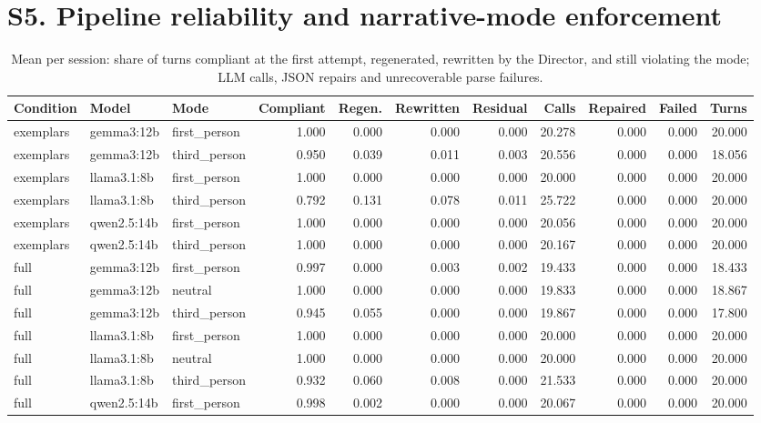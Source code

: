 \documentclass[10pt]{article}
\begin{document}
\section*{S5. Pipeline reliability and narrative-mode enforcement}

{\scriptsize
\begin{longtable}{lllrrrrrrrr}
\caption{Mean per session: share of turns compliant at the first attempt, regenerated, rewritten by the Director, and still violating the mode; LLM calls, JSON repairs and unrecoverable parse failures.}\\
\toprule
Condition & Model & Mode & Compliant & Regen. & Rewritten & Residual & Calls & Repaired & Failed & Turns \\
\midrule
\endhead
exemplars & gemma3:12b & first\_person & 1.000 & 0.000 & 0.000 & 0.000 & 20.278 & 0.000 & 0.000 & 20.000 \\
exemplars & gemma3:12b & third\_person & 0.950 & 0.039 & 0.011 & 0.003 & 20.556 & 0.000 & 0.000 & 18.056 \\
exemplars & llama3.1:8b & first\_person & 1.000 & 0.000 & 0.000 & 0.000 & 20.000 & 0.000 & 0.000 & 20.000 \\
exemplars & llama3.1:8b & third\_person & 0.792 & 0.131 & 0.078 & 0.011 & 25.722 & 0.000 & 0.000 & 20.000 \\
exemplars & qwen2.5:14b & first\_person & 1.000 & 0.000 & 0.000 & 0.000 & 20.056 & 0.000 & 0.000 & 20.000 \\
exemplars & qwen2.5:14b & third\_person & 1.000 & 0.000 & 0.000 & 0.000 & 20.167 & 0.000 & 0.000 & 20.000 \\
full & gemma3:12b & first\_person & 0.997 & 0.000 & 0.003 & 0.002 & 19.433 & 0.000 & 0.000 & 18.433 \\
full & gemma3:12b & neutral & 1.000 & 0.000 & 0.000 & 0.000 & 19.833 & 0.000 & 0.000 & 18.867 \\
full & gemma3:12b & third\_person & 0.945 & 0.055 & 0.000 & 0.000 & 19.867 & 0.000 & 0.000 & 17.800 \\
full & llama3.1:8b & first\_person & 1.000 & 0.000 & 0.000 & 0.000 & 20.000 & 0.000 & 0.000 & 20.000 \\
full & llama3.1:8b & neutral & 1.000 & 0.000 & 0.000 & 0.000 & 20.000 & 0.000 & 0.000 & 20.000 \\
full & llama3.1:8b & third\_person & 0.932 & 0.060 & 0.008 & 0.000 & 21.533 & 0.000 & 0.000 & 20.000 \\
full & qwen2.5:14b & first\_person & 0.998 & 0.002 & 0.000 & 0.000 & 20.067 & 0.000 & 0.000 & 20.000 \\

\end{longtable}}
\end{document}
